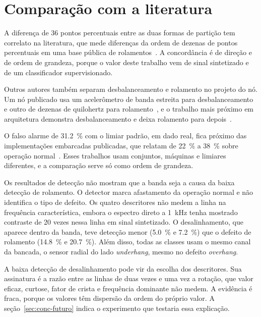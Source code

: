 \section{Comparação com a literatura}
\label{sec:res-discussao}

A diferença de \num{36} pontos percentuais entre as duas formas de partição tem correlato na
literatura, que mede diferenças da ordem de dezenas de pontos percentuais em uma base pública de
rolamentos~\cite{varejao2025,vieira2026}. A concordância é de direção e de ordem de grandeza, porque
o valor deste trabalho vem de sinal sintetizado e de um classificador supervisionado.

Outros autores também separam desbalanceamento e rolamento no projeto do nó. Um nó publicado usa um
acelerômetro de banda estreita para desbalanceamento e outro de dezenas de quilohertz para
rolamento~\cite{jakobsen2024}, e o trabalho mais próximo em arquitetura demonstra desbalanceamento e
deixa rolamento para depois~\cite{kolok2025}.

O falso alarme de \SI{31,2}{\percent} com o limiar padrão, em dado real, fica próximo das
implementações embarcadas publicadas, que relatam de \SI{22}{\percent} a \SI{38}{\percent} sobre
operação normal~\cite{chevtchenko2023,kolok2025}. Esses trabalhos usam conjuntos, máquinas e limiares
diferentes, e a comparação serve só como ordem de grandeza.

Os resultados de detecção não mostram que a banda seja a causa da baixa detecção de rolamento. O
detector marca afastamento da operação normal e não identifica o tipo de defeito. Os quatro descritores
não medem a linha na frequência característica, embora o espectro direto a \SI{1}{\kilo\hertz} tenha
mostrado contraste de \num{20} vezes nessa linha em sinal sintetizado. O desalinhamento, que aparece
dentro da banda, teve detecção menor (\SI{5,0}{\percent} e \SI{7,2}{\percent}) que o defeito de
rolamento (\SI{14,8}{\percent} e \SI{20,7}{\percent}). Além disso, todas as classes usam o mesmo canal
da bancada, o sensor radial do lado \emph{underhang}, mesmo no defeito \emph{overhang}.

A baixa detecção de desalinhamento pode vir da escolha dos descritores. Sua assinatura é a razão entre
as linhas de duas vezes e uma vez a rotação, que valor eficaz, curtose, fator de crista e frequência
dominante não medem. A evidência é fraca, porque os valores têm dispersão da ordem do próprio valor. A
seção~\ref{sec:conc-futuro} indica o experimento que testaria essa explicação.

